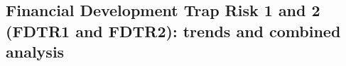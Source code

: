 \documentclass[a4paper,11pt,oneside]{article}
\begin{document}






\subsection{Financial Development Trap Risk 1 and 2 (FDTR1 and FDTR2): trends and combined analysis}
\end{document}
